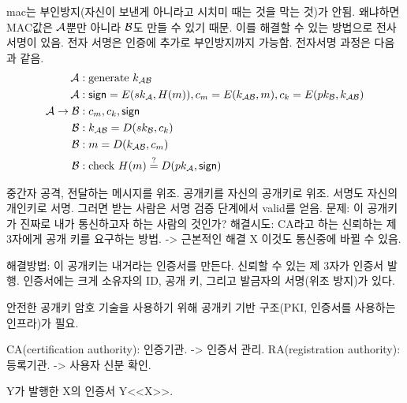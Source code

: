 mac는 부인방지(자신이 보낸게 아니라고 시치미 때는 것을 막는 것)가 안됨. 왜냐하면
MAC값은 $\mathcal{A}$뿐만 아니라 $\mathcal{B}$도 만들 수 있기 때문. 이를 해결할 수 있는
방법으로 전사서명이 있음. 전자 서명은 인증에 추가로 부인방지까지 가능함.
전자서명 과정은 다음과 같음.
\begin{equation}
  \begin{split}
    \mathcal{A} &: \text{generate } k_{\mathcal{A} \mathcal{B}} \\
    \mathcal{A} &: \textsf{sign} = E(sk_{\mathcal{A}}, H(m)), c_{m} = E(k_{\mathcal{A} \mathcal{B}}, m),
    c_{k} = E(pk_{\mathcal{B}}, k_{\mathcal{A} \mathcal{B}}) \\
    \mathcal{A} \to \mathcal{B} &: c_{m}, c_{k}, \textsf{sign} \\
    \mathcal{B} &: k_{\mathcal{A} \mathcal{B}} = D(sk_{\mathcal{B}}, c_{k}) \\
    \mathcal{B} &: m = D(k_{\mathcal{A} \mathcal{B}}, c_{m}) \\
    \mathcal{B} &: \text{check } H(m) \overset{?}{=} D(pk_{\mathcal{A}}, \textsf{sign})
  \end{split}
\end{equation}

중간자 공격, 전달하는 메시지를 위조. 공개키를 자신의 공개키로 위조. 서명도
자신의 개인키로 서명. 그러면 받는 사람은 서명 검증 단계에서 valid를 얻음. 문제:
이 공개키가 진짜로 내가 통신하고자 하는 사람의 것인가? 해결시도: CA라고 하는
신뢰하는 제 3자에게 공개 키를 요구하는 방법. -> 근본적인 해결 X 이것도 통신중에
바뀔 수 있음.

해결방법: 이 공개키는 내거라는 인증서를 만든다. 신뢰할 수 있는 제 3자가 인증서
발행. 인증서에는 크게 소유자의 ID, 공개 키, 그리고 발금자의 서명(위조 방지)가
있다.

안전한 공개키 암호 기술을 사용하기 위해 공개키 기반 구조(PKI, 인증서를 사용하는
인프라)가 필요.

CA(certification authority): 인증기관. -> 인증서 관리.
RA(registration authority): 등록기관. -> 사용자 신분 확인.

Y가 발행한 X의 인증서 Y<<X>>.

